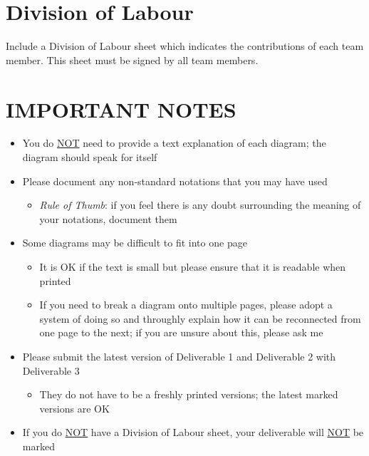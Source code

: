 \documentclass[]{article}
\begin{document}

\appendix
\section{Division of Labour}
\label{sec:division_of_labour}
Include a Division of Labour sheet which indicates the contributions of each team member. This sheet must be signed by all team members.

\newpage
\section*{IMPORTANT NOTES}
\begin{itemize}
	\item You do \underline{NOT} need to provide a text explanation of each diagram; the diagram should speak for itself
	\item Please document any non-standard notations that you may have used
	\begin{itemize}
		\item \emph{Rule of Thumb}: if you feel there is any doubt surrounding the meaning of your notations, document them
	\end{itemize}
	\item Some diagrams may be difficult to fit into one page
	\begin{itemize}
		\item It is OK if the text is small but please ensure that it is readable when printed
		\item If you need to break a diagram onto multiple pages, please adopt a system of doing so and throughly explain how it can be reconnected from one page to the next; if you are unsure about this, please ask me
	\end{itemize}
	\item Please submit the latest version of Deliverable 1 and Deliverable 2 with Deliverable 3
	\begin{itemize}
		\item They do not have to be a freshly printed versions; the latest marked versions are OK
	\end{itemize}
	\item If you do \underline{NOT} have a Division of Labour sheet, your deliverable will \underline{NOT} be marked
\end{itemize}
\end{document}
